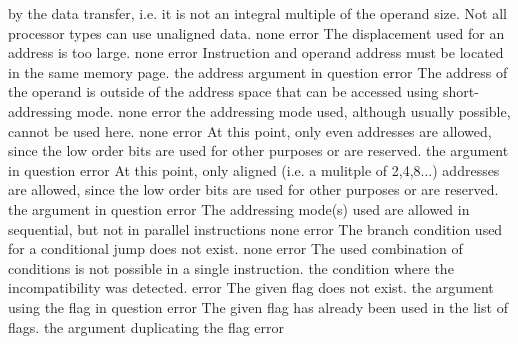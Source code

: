 \documentclass[12pt,twoside]{report}
\begin{document}
\begin{description}
{                by the data transfer, i.e. it is not an integral multiple of
                the operand size. Not all processor types can use unaligned
                data.}
               {none}
               {error}
               {The displacement used for an address is too large.}
               {none}
               {error}
               {Instruction and operand address must be located in the
                same memory page.}
               {the address argument in question}
               {error}
               {The address of the operand is outside of the address space
                that can be accessed using short-addressing mode.}
               {none}
               {error}
               {the addressing mode used, although usually possible,
                cannot be used here.}
               {none}
               {error}
               {At this point, only even addresses are allowed, since the
                low order bits are used for other purposes or are reserved.}
               {the argument in question}
               {error}
               {At this point, only aligned (i.e. a mulitple of 2,4,8...) addresses
                are allowed, since the low order bits are used for other purposes
                or are reserved.}
               {the argument in question}
               {error}
               {The addressing mode(s) used are allowed in sequential,
                but not in parallel instructions}
               {none}
               {error}
               {The branch condition used for a conditional jump does not
                exist.}
               {none}
               {error}
               {The used combination of conditions is not possible
                in a single instruction.}
               {the condition where the incompatibility was detected.}
               {error}
               {The given flag does not exist.}
               {the argument using the flag in question}
               {error}
               {The given flag has already been used in the list of flags.}
               {the argument duplicating the flag}
               {error}

\end{description}
\end{document}
